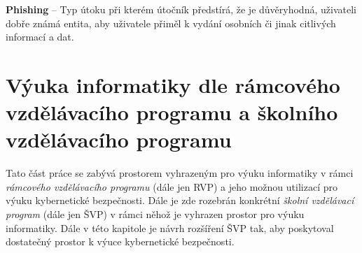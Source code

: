 \documentclass[a4paper, 12pt]{article}
\begin{document}
\textbf{Phishing} -- Typ útoku při kterém útočník předstírá, že je důvěryhodná, uživateli dobře známá entita, aby uživatele přiměl k vydání osobních či jinak citlivých informací a dat.


\newpage
\section{Výuka informatiky dle rámcového vzdělávacího programu a školního vzdělávacího programu}
Tato část práce se zabývá prostorem vyhrazeným pro výuku informatiky v rámci \textit{rámcového vzdělávacího programu} (dále jen RVP) a jeho možnou utilizací pro výuku kybernetické bezpečnosti. Dále je zde rozebrán konkrétní \textit{školní vzdělávací program} (dále jen ŠVP) v rámci něhož je vyhrazen prostor pro výuku informatiky. Dále v této kapitole je návrh rozšíření ŠVP tak, aby poskytoval dostatečný prostor k výuce kybernetické bezpečnosti. 
\end{document}

